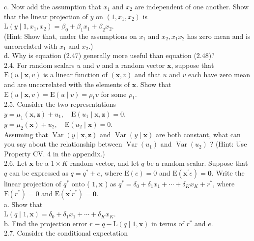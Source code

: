 \documentclass[10pt]{article}
\begin{document}
c. Now add the assumption that $x_{1}$ and $x_{2}$ are independent of one another. Show that the linear projection of $y$ on $\left(1, x_{1}, x_{2}\right)$ is\\
$\mathrm{L}\left(y \mid 1, x_{1}, x_{2}\right)=\beta_{0}+\beta_{1} x_{1}+\beta_{2} x_{2}$.\\
(Hint: Show that, under the assumptions on $x_{1}$ and $x_{2}, x_{1} x_{2}$ has zero mean and is uncorrelated with $x_{1}$ and $x_{2}$.)\\
d. Why is equation (2.47) generally more useful than equation (2.48)?\\
2.4. For random scalars $u$ and $v$ and a random vector $\mathbf{x}$, suppose that $\mathrm{E}(u \mid \mathbf{x}, v)$ is a linear function of $(\mathbf{x}, v)$ and that $u$ and $v$ each have zero mean and are uncorrelated with the elements of $\mathbf{x}$. Show that $\mathrm{E}(u \mid \mathbf{x}, v)=\mathrm{E}(u \mid v)=\rho_{1} v$ for some $\rho_{1}$.\\
2.5. Consider the two representations\\
$y=\mu_{1}(\mathbf{x}, \mathbf{z})+u_{1}, \quad \mathrm{E}\left(u_{1} \mid \mathbf{x}, \mathbf{z}\right)=0$.\\
$y=\mu_{2}(\mathbf{x})+u_{2}, \quad \mathrm{E}\left(u_{2} \mid \mathbf{x}\right)=0$.\\
Assuming that $\operatorname{Var}(y \mid \mathbf{x}, \mathbf{z})$ and $\operatorname{Var}(y \mid \mathbf{x})$ are both constant, what can you say about the relationship between $\operatorname{Var}\left(u_{1}\right)$ and $\operatorname{Var}\left(u_{2}\right)$ ? (Hint: Use Property CV. 4 in the appendix.)\\
2.6. Let $\mathbf{x}$ be a $1 \times K$ random vector, and let $q$ be a random scalar. Suppose that $q$ can be expressed as $q=q^{*}+e$, where $\mathrm{E}(e)=0$ and $\mathrm{E}\left(\mathbf{x}^{\prime} e\right)=\mathbf{0}$. Write the linear projection of $q^{*}$ onto ( $1, \mathbf{x}$ ) as $q^{*}=\delta_{0}+\delta_{1} x_{1}+\cdots+\delta_{K} x_{K}+r^{*}$, where $\mathrm{E}\left(r^{*}\right)=0$ and $\mathrm{E}\left(\mathbf{x}^{\prime} r^{*}\right)=\mathbf{0}$.\\
a. Show that\\
$\mathrm{L}(q \mid 1, \mathbf{x})=\delta_{0}+\delta_{1} x_{1}+\cdots+\delta_{K} x_{K}$.\\
b. Find the projection error $r \equiv q-\mathrm{L}(q \mid 1, \mathbf{x})$ in terms of $r^{*}$ and $e$.\\
2.7. Consider the conditional expectation\\
\end{document}
